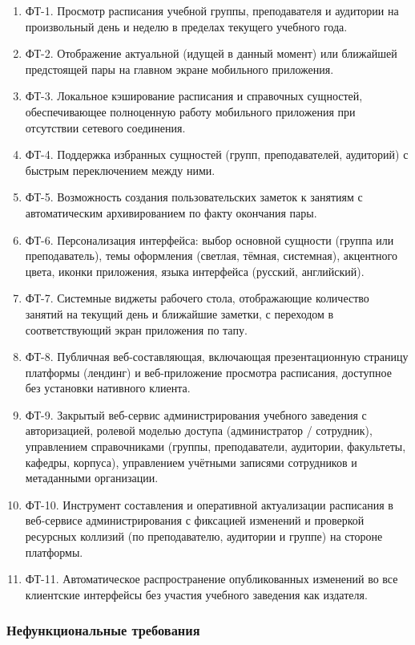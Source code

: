 \begin{enumerate}
  \item ФТ-1. Просмотр расписания учебной группы, преподавателя и аудитории на произвольный день и неделю в пределах текущего учебного года.
  \item ФТ-2. Отображение актуальной (идущей в данный момент) или ближайшей предстоящей пары на главном экране мобильного приложения.
  \item ФТ-3. Локальное кэширование расписания и справочных сущностей, обеспечивающее полноценную работу мобильного приложения при отсутствии сетевого соединения.
  \item ФТ-4. Поддержка избранных сущностей (групп, преподавателей, аудиторий) с быстрым переключением между ними.
  \item ФТ-5. Возможность создания пользовательских заметок к занятиям с автоматическим архивированием по факту окончания пары.
  \item ФТ-6. Персонализация интерфейса: выбор основной сущности (группа или преподаватель), темы оформления (светлая, тёмная, системная), акцентного цвета, иконки приложения, языка интерфейса (русский, английский).
  \item ФТ-7. Системные виджеты рабочего стола, отображающие количество занятий на текущий день и ближайшие заметки, с переходом в соответствующий экран приложения по тапу.
  \item ФТ-8. Публичная веб-составляющая, включающая презентационную страницу платформы (лендинг) и веб-приложение просмотра расписания, доступное без установки нативного клиента.
  \item ФТ-9. Закрытый веб-сервис администрирования учебного заведения с авторизацией, ролевой моделью доступа (администратор / сотрудник), управлением справочниками (группы, преподаватели, аудитории, факультеты, кафедры, корпуса), управлением учётными записями сотрудников и метаданными организации.
  \item ФТ-10. Инструмент составления и оперативной актуализации расписания в веб-сервисе администрирования с фиксацией изменений и проверкой ресурсных коллизий (по преподавателю, аудитории и группе) на стороне платформы.
  \item ФТ-11. Автоматическое распространение опубликованных изменений во все клиентские интерфейсы без участия учебного заведения как издателя.
\end{enumerate}

\subsubsection{Нефункциональные требования}
\label{subsubsec:nfr}

